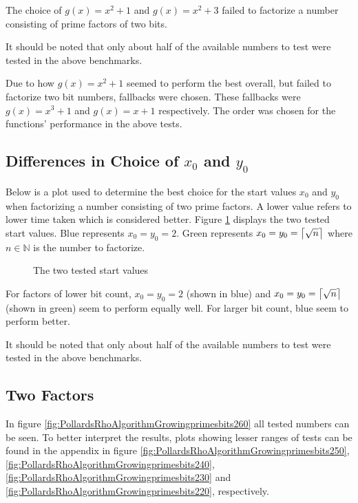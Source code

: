 The choice of $g(x)=x^2+1$ and $g(x)=x^2+3$ failed to factorize a number consisting of prime factors of two bits.

It should be noted that only about half of the available numbers to test were tested in the above benchmarks.

Due to how $g(x)=x^2+1$ seemed to perform the best overall, but failed to factorize two bit numbers, fallbacks were chosen. These fallbacks were $g(x)=x^3+1$ and $g(x)=x+1$ respectively. The order was chosen for the functions' performance in the above tests.

\subsection{Differences in Choice of $x_0$ and $y_0$}

Below is a plot used to determine the best choice for the start values $x_0$ and $y_0$ when factorizing a number consisting of two prime factors. A lower value refers to lower time taken which is considered better. Figure \ref{fig:pollardsStart} displays the two tested start values. Blue represents $x_0=y_0=2$. Green represents $x_0=y_0=\ceil[\big]{\sqrt{n}}$ where $n\in\mathbb{N}$ is the number to factorize.

\begin{figure}[H]
    \centering
    
    \vspace{-0.3cm}
    \caption{The two tested start values}\label{fig:pollardsStart}
\end{figure}

For factors of lower bit count, $x_0=y_0=2$ (shown in blue) and $x_0=y_0=\ceil[\big]{\sqrt{n}}$ (shown in green) seem to perform equally well. For larger bit count, blue seem to perform better.

It should be noted that only about half of the available numbers to test were tested in the above benchmarks.

\subsection{Two Factors}



In figure \ref{fig:PollardsRhoAlgorithmGrowingprimesbits260} all tested numbers can be seen. To better interpret the results, plots showing lesser ranges of tests can be found in the appendix in figure \ref{fig:PollardsRhoAlgorithmGrowingprimesbits250}, \ref{fig:PollardsRhoAlgorithmGrowingprimesbits240}, \ref{fig:PollardsRhoAlgorithmGrowingprimesbits230} and \ref{fig:PollardsRhoAlgorithmGrowingprimesbits220}, respectively.

